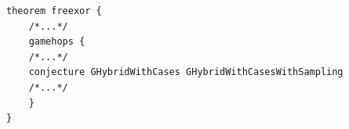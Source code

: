 \begin{longlisting}
\begin{verbatim}
theorem freexor {
    /*...*/
    gamehops {
    /*...*/
    conjecture GHybridWithCases GHybridWithCasesWithSampling
    /*...*/
    }
}
\end{verbatim}
\caption{Game hop 4 in the  theorem}
\label{lst:domino-freexor-gamehop3}
\end{longlisting}